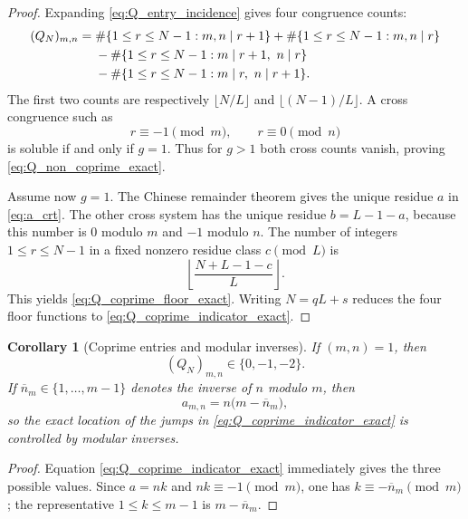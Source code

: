 \documentclass[11pt]{amsart}
\numberwithin{equation}{section}
\theoremstyle{plain}
\newtheorem{corollary}[theorem]{Corollary}
\theoremstyle{definition}
\theoremstyle{remark}
\begin{document}
\begin{proof}
Expanding \eqref{eq:Q_entry_incidence} gives four congruence counts:
\begin{align}
(Q_N)_{m,n}
={}&\#\{1\le r\le N-1:m,n\mid r+1\}
+\#\{1\le r\le N-1:m,n\mid r\}\notag\\
&-\#\{1\le r\le N-1:m\mid r+1,\ n\mid r\}\notag\\
&-\#\{1\le r\le N-1:m\mid r,\ n\mid r+1\}.
\label{eq:Q_four_counts}
\end{align}
The first two counts are respectively $\lfloor N/L\rfloor$ and $\lfloor(N-1)/L\rfloor$.  A cross congruence such as
\begin{equation}
r\equiv-1\pmod m,
\qquad r\equiv0\pmod n
\end{equation}
is soluble if and only if $g=1$.  Thus for $g>1$ both cross counts vanish, proving \eqref{eq:Q_non_coprime_exact}.

Assume now $g=1$.  The Chinese remainder theorem gives the unique residue $a$ in \eqref{eq:a_crt}.  The other cross system has the unique residue $b=L-1-a$, because this number is $0$ modulo $m$ and $-1$ modulo $n$.  The number of integers $1\le r\le N-1$ in a fixed nonzero residue class $c\pmod L$ is
\begin{equation}
\left\lfloor\frac{N+L-1-c}{L}\right\rfloor.
\end{equation}
This yields \eqref{eq:Q_coprime_floor_exact}.  Writing $N=qL+s$ reduces the four floor functions to \eqref{eq:Q_coprime_indicator_exact}.
\end{proof}

\begin{corollary}[Coprime entries and modular inverses]
\label{cor:Q_coprime_values}
If $(m,n)=1$, then
\begin{equation}
(Q_N)_{m,n}\in\{0,-1,-2\}.
\label{eq:Q_coprime_three_values}
\end{equation}
If $\overline n_m\in\{1,\ldots,m-1\}$ denotes the inverse of $n$ modulo $m$, then
\begin{equation}
a_{m,n}=n\bigl(m-\overline n_m\bigr),
\label{eq:a_modular_inverse}
\end{equation}
so the exact location of the jumps in \eqref{eq:Q_coprime_indicator_exact} is controlled by modular inverses.
\end{corollary}

\begin{proof}
Equation \eqref{eq:Q_coprime_indicator_exact} immediately gives the three possible values.  Since $a=nk$ and $nk\equiv-1\pmod m$, one has $k\equiv-\overline n_m\pmod m$; the representative $1\le k\le m-1$ is $m-\overline n_m$.
\end{proof}
\end{document}
